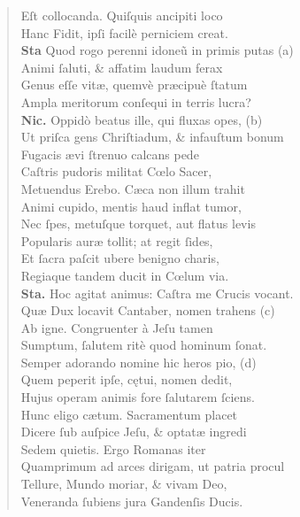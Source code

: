 \documentclass[a4paper,12pt]{article}
\begin{document}
\begin{verse}
Eſt collocanda. Quiſquis ancipiti loco\\[0pt]
Hanc Fidit, ipſi facilè perniciem creat.\\[0pt]
\textbf{Sta} Quod rogo perenni idoneũ in primis putas (a)\footnotemark\\[0pt]
Animi ſaluti, \& affatim laudum ferax\\[0pt]
Genus eſſe vitæ, quemvè præcipuè ſtatum\\[0pt]
Ampla meritorum conſequi in terris lucra?\\[0pt]
\textbf{Nic.} Oppidò beatus ille, qui fluxas opes, (b)\footnotemark\\[0pt]
Ut priſca gens Chriſtiadum, \& infauſtum bonum\\[0pt]
Fugacis ævi ſtrenuo calcans pede\\[0pt]
Caſtris pudoris militat Cœlo Sacer,\\[0pt]
Metuendus Erebo. Cæca non illum trahit\\[0pt]
Animi cupido, mentis haud inflat tumor,\\[0pt]
Nec ſpes, metuſque torquet, aut flatus levis\\[0pt]
Popularis auræ tollit; at regit ſides,\\[0pt]
Et ſacra paſcit ubere benigno charis,\\[0pt]
Regiaque tandem ducit in Cœlum via.\\[0pt]
\textbf{Sta.} Hoc agitat animus: Caſtra me Crucis vocant.\\[0pt]
Quæ Dux locavit Cantaber, nomen trahens (c)\footnotemark\\[0pt]
Ab igne. Congruenter à Jeſu tamen\\[0pt]
Sumptum, ſalutem ritè quod hominum ſonat.\\[0pt]
Semper adorando nomine hic heros pio, (d)\footnotemark\\[0pt]
Quem peperit ipſe, cętui, nomen dedit,\\[0pt]
Hujus operam animis fore ſalutarem ſciens.\\[0pt]
Hunc eligo cætum. Sacramentum placet\\[0pt]
Dicere ſub auſpice Jeſu, \& optatæ ingredi\\[0pt]
Sedem quietis. Ergo Romanas iter\\[0pt]
Quamprimum ad arces dirigam, ut patria procul\\[0pt]
Tellure, Mundo moriar, \& vivam Deo,\\[0pt]
Veneranda ſubiens jura Gandenſis Ducis.\\[0pt]

\end{verse}
\end{document}
